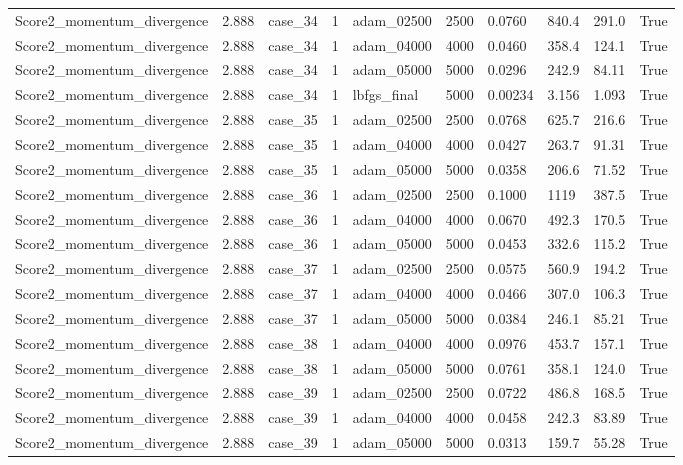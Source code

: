 \begin{longtable}{llllllllll}
Score2\_momentum\_divergence & 2.888 & case\_34 & 1 & adam\_02500 & 2500 & 0.0760 & 840.4 & 291.0 & True \\
Score2\_momentum\_divergence & 2.888 & case\_34 & 1 & adam\_04000 & 4000 & 0.0460 & 358.4 & 124.1 & True \\
Score2\_momentum\_divergence & 2.888 & case\_34 & 1 & adam\_05000 & 5000 & 0.0296 & 242.9 & 84.11 & True \\
Score2\_momentum\_divergence & 2.888 & case\_34 & 1 & lbfgs\_final & 5000 & 0.00234 & 3.156 & 1.093 & True \\
Score2\_momentum\_divergence & 2.888 & case\_35 & 1 & adam\_02500 & 2500 & 0.0768 & 625.7 & 216.6 & True \\
Score2\_momentum\_divergence & 2.888 & case\_35 & 1 & adam\_04000 & 4000 & 0.0427 & 263.7 & 91.31 & True \\
Score2\_momentum\_divergence & 2.888 & case\_35 & 1 & adam\_05000 & 5000 & 0.0358 & 206.6 & 71.52 & True \\
Score2\_momentum\_divergence & 2.888 & case\_36 & 1 & adam\_02500 & 2500 & 0.1000 & 1119 & 387.5 & True \\
Score2\_momentum\_divergence & 2.888 & case\_36 & 1 & adam\_04000 & 4000 & 0.0670 & 492.3 & 170.5 & True \\
Score2\_momentum\_divergence & 2.888 & case\_36 & 1 & adam\_05000 & 5000 & 0.0453 & 332.6 & 115.2 & True \\
Score2\_momentum\_divergence & 2.888 & case\_37 & 1 & adam\_02500 & 2500 & 0.0575 & 560.9 & 194.2 & True \\
Score2\_momentum\_divergence & 2.888 & case\_37 & 1 & adam\_04000 & 4000 & 0.0466 & 307.0 & 106.3 & True \\
Score2\_momentum\_divergence & 2.888 & case\_37 & 1 & adam\_05000 & 5000 & 0.0384 & 246.1 & 85.21 & True \\
Score2\_momentum\_divergence & 2.888 & case\_38 & 1 & adam\_04000 & 4000 & 0.0976 & 453.7 & 157.1 & True \\
Score2\_momentum\_divergence & 2.888 & case\_38 & 1 & adam\_05000 & 5000 & 0.0761 & 358.1 & 124.0 & True \\
Score2\_momentum\_divergence & 2.888 & case\_39 & 1 & adam\_02500 & 2500 & 0.0722 & 486.8 & 168.5 & True \\
Score2\_momentum\_divergence & 2.888 & case\_39 & 1 & adam\_04000 & 4000 & 0.0458 & 242.3 & 83.89 & True \\
Score2\_momentum\_divergence & 2.888 & case\_39 & 1 & adam\_05000 & 5000 & 0.0313 & 159.7 & 55.28 & True \\

\end{longtable}

